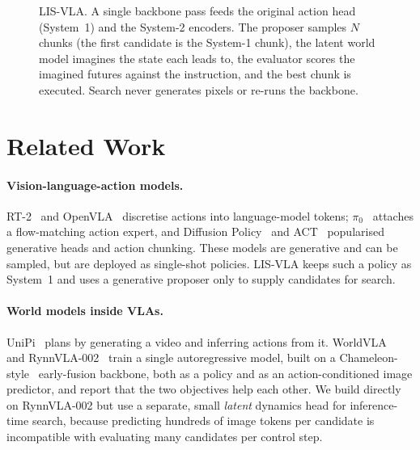 \documentclass[11pt]{article}
\begin{document}
\begin{figure}[t]
{}
\caption{LIS-VLA. A single backbone pass feeds the original action head (System~1) and the System-2 encoders. The proposer samples $N$ chunks (the first candidate is the System-1 chunk), the latent world model imagines the state each leads to, the evaluator scores the imagined futures against the instruction, and the best chunk is executed. Search never generates pixels or re-runs the backbone.}
\label{fig:arch}
\end{figure}

\section{Related Work}
\label{sec:related}

\paragraph{Vision-language-action models.}
RT-2~\citep{brohan2023rt2} and OpenVLA~\citep{kim2024openvla} discretise actions into language-model tokens; $\pi_0$~\citep{black2024pi0} attaches a flow-matching action expert, and Diffusion Policy~\citep{chi2023diffusionpolicy} and ACT~\citep{zhao2023act} popularised generative heads and action chunking. These models are generative and can be sampled, but are deployed as single-shot policies. LIS-VLA keeps such a policy as System~1 and uses a generative proposer only to supply candidates for search.

\paragraph{World models inside VLAs.}
UniPi~\citep{du2023unipi} plans by generating a video and inferring actions from it. WorldVLA~\citep{cen2025worldvla} and RynnVLA-002~\citep{cen2025rynnvla002} train a single autoregressive model, built on a Chameleon-style~\citep{chameleon2024} early-fusion backbone, both as a policy and as an action-conditioned image predictor, and report that the two objectives help each other. We build directly on RynnVLA-002 but use a separate, small \emph{latent} dynamics head for inference-time search, because predicting hundreds of image tokens per candidate is incompatible with evaluating many candidates per control step.
\end{document}
